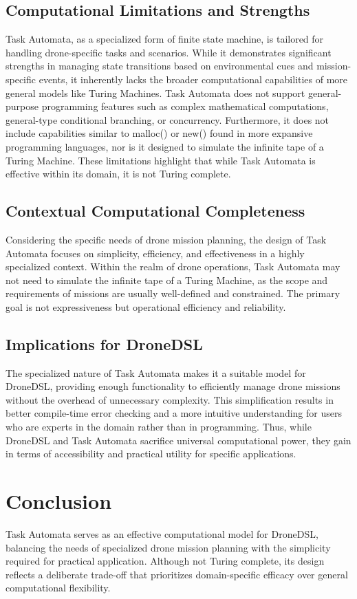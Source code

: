 \subsection{Computational Limitations and Strengths}
Task Automata, as a specialized form of finite state machine, is tailored for handling drone-specific tasks and scenarios. While it demonstrates significant strengths in managing state transitions based on environmental cues and mission-specific events, it inherently lacks the broader computational capabilities of more general models like Turing Machines. Task Automata does not support general-purpose programming features such as complex mathematical computations, general-type conditional branching, or concurrency. Furthermore, it does not include capabilities similar to malloc() or new() found in more expansive programming languages, nor is it designed to simulate the infinite tape of a Turing Machine. These limitations highlight that while Task Automata is effective within its domain, it is not Turing complete.

\subsection{Contextual Computational Completeness}
Considering the specific needs of drone mission planning, the design of Task Automata focuses on simplicity, efficiency, and effectiveness in a highly specialized context. Within the realm of drone operations, Task Automata may not need to simulate the infinite tape of a Turing Machine, as the scope and requirements of missions are usually well-defined and constrained. The primary goal is not expressiveness but operational efficiency and reliability.


\subsection{Implications for DroneDSL}
The specialized nature of Task Automata makes it a suitable model for DroneDSL, providing enough functionality to efficiently manage drone missions without the overhead of unnecessary complexity. This simplification results in better compile-time error checking and a more intuitive understanding for users who are experts in the domain rather than in programming. Thus, while DroneDSL and Task Automata sacrifice universal computational power, they gain in terms of accessibility and practical utility for specific applications.

\section{Conclusion}
Task Automata serves as an effective computational model for DroneDSL, balancing the needs of specialized drone mission planning with the simplicity required for practical application. Although not Turing complete, its design reflects a deliberate trade-off that prioritizes domain-specific efficacy over general computational flexibility.
